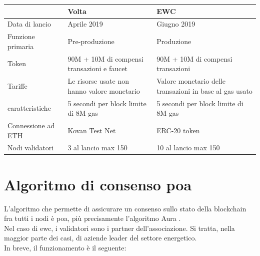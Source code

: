 \documentclass[12pt, letterpaper, twoside]{article}
\begin{document}
\begin{tabular}{||p{4cm}|p{5cm} p{5cm}||}
    \hline
                       & Volta                                               & EWC                                                     \\ [0.5ex]
    \hline\hline
    Data di lancio     & Aprile 2019                                         & Giugno 2019                                             \\
    \hline
    Funzione primaria  & Pre-produzione                                      & Produzione                                              \\
    \hline
    Token              & 90M + 10M di compensi \newline transazioni e faucet & 90M + 10M di compensi \newline transazioni              \\
    \hline
    Tariffe            & Le risorse usate non hanno valore monetario         & Valore monetario delle transazioni in base al gas usato \\
    \hline
    caratteristiche    & 5 secondi per block \newline limite di 8M gas       & 5 secondi per block \newline limite di 8M gas           \\
    \hline
    Connessione ad ETH & Kovan Test Net                                      & ERC-20 token                                            \\
    \hline
    Nodi validatori    & 3 al lancio \newline max 150                        & 10 al lancio \newline max 150                           \\ [1ex]
    \hline
\end{tabular}
 
\newpage
 
\section{Algoritmo di consenso \gls{poa}}
L'algoritmo che permette di assicurare un consenso sullo stato della blockchain fra tutti i nodi è \gls{poa}, più precisamente l'algoritmo Aura \cite{art:aura}\cite{wiki:poa}. \\
Nel caso di \gls{ewc}, i validatori sono i partner dell'associazione.
Si tratta, nella maggior parte dei casi, di aziende leader del settore energetico. \\
In breve, il funzionamento è il seguente:
 
\end{document}
